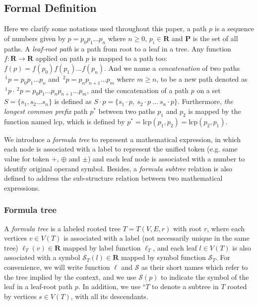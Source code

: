 \documentclass{acm_proc_article-sp}
\begin{document}
\subsection{Formal Definition}
Here we clarify some notations used throughout this paper, a path $p$ is a sequence of numbers given by $p = p_0 p_1 \ldots p_n$ where $n\ge0$, $p_i \in \mathbf{R}$ and $\mathbf{P}$ is the set of all paths.
A \textit{leaf-root path} is a path from root to a leaf in a tree.
Any function $f: \mathbf{R} \rightarrow \mathbf{R}$ applied on path $p$ is mapped to a path too: $f(p)=f(p_0)f(p_1) \ldots f(p_n)$.
And we name  a \textit{concatenation} of two paths $\,^1p = p_0p_1 \ldots p_n$ and $\,^2p = p_np_{n+1} \ldots p_m$ where $m \ge n$, to be a new path denoted as $\,^1p \cdot \,^2p = p_0p_1 \ldots p_n p_{n+1} \ldots p_m$,
and the concatenation of a path $p$ on a set $S = \{ s_1, s_2 \ldots s_n \}$ is defined as $S \cdot p = \{ s_1\cdot p,\  s_2\cdot p \ \ldots \ s_n\cdot p \}$.
Furthermore, \textit{the longest common prefix} path $p^*$ between two paths $p_1$ and $p_2$ is mapped by the function named $\mathrm{lcp}$, which is defined by $p^* = \mathrm{lcp}(p_1, p_2) = \mathrm{lcp}(p_2, p_1)$.

We introduce a \textit{formula tree} to represent a mathematical expression, in which each node is associated with a label to represent the unified token (e.g. same value for token $+$, $\oplus$ and $\pm$) and each leaf node is associated with a number to identify original operand symbol. 
Besides, a \textit{formula subtree} relation is also defined to address the sub-structure relation between two mathematical expressions.

\subsubsection{Formula tree}
A \textit{formula tree} is a labeled rooted tree $T = T(V,E,r)$ with root $r$, where each vertices $v \in V(T)$ is associated with a label (not necessarily unique in the same tree) $\ell_T(v) \in \mathbf{R}$ mapped by label function $\ell_T$,
and each leaf $l \in V(T)$ is also associated with a symbol $\mathcal{S}_T(l) \in \mathbf{R}$ mapped by symbol function $\mathcal{S}_T$. 
For convenience, we will write function $\ell$ and $\mathcal{S}$ as their short names which refer to the tree implied by the context, and we use $\mathcal{S}(p)$ to indicate the symbol of the leaf in a leaf-root path $p$.
In addition, we use $^s T$ to denote a subtree in $T$ rooted by vertices $s \in V(T)$, with all its descendants.
\end{document}
